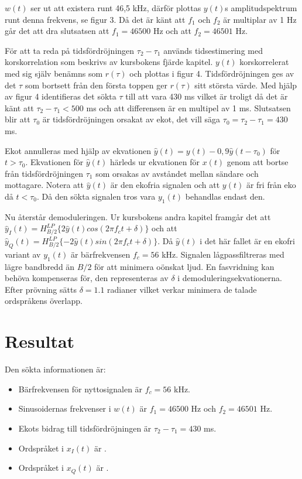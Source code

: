 \documentclass[10pt,twocolumn]{article}
\begin{document}
$w(t)$ ser ut att existera runt 46,5 kHz, därför plottas $y(t)$s amplitudspektrum runt denna frekvens, se figur 3. Då det är känt att $f_1$ och $f_2$ är multiplar av 1 Hz går det att dra slutsatsen att $f_1=46500$ Hz och att $f_2=46501$ Hz.

För att ta reda på tidsfördröjningen $\tau_2-\tau_1$ används tidsestimering med korskorrelation som beskrivs av kursbokens fjärde kapitel. $y(t)$ korskorrelerat med sig själv benämns som $r(\tau)$ och plottas i figur 4. Tidsfördröjningen ges av det $\tau$ som bortsett från den första toppen ger $r(\tau)$ sitt största värde. Med hjälp av figur 4 identifieras det sökta $\tau$ till att vara 430 ms vilket är troligt då det är känt att $\tau_2-\tau_1 < 500$ ms och att differensen är en multipel av 1 ms. Slutsatsen blir att $\tau_0$ är tidsfördröjningen orsakat av ekot, det vill säga $\tau_0=\tau_2-\tau_1=430$ ms.

Ekot annulleras med hjälp av ekvationen $\hat{y}(t)=y(t) - 0,9\hat{y}(t-\tau_0)$ för $t > \tau_0$. Ekvationen för $\hat{y}(t)$ härleds ur ekvationen för $x(t)$ genom att bortse från tidsfördröjningen $\tau_1$ som orsakas av avståndet mellan sändare och mottagare. Notera att $\hat{y}(t)$ är den ekofria signalen och att $y(t)$ är fri från eko då $t < \tau_0$. Då den sökta signalen tros vara $y_1(t)$ behandlas endast den. 

Nu återstår demoduleringen. Ur kursbokens andra kapitel framgår det att $\hat{y}_I(t)=H^{LP}_{B/2}\{2\hat{y}(t)cos(2\pi f_{c}t+\delta)\}$ och att $\hat{y}_Q(t)=H^{LP}_{B/2}\{-2\hat{y}(t)sin(2\pi f_{c}t+\delta)\}$. Då $\hat{y}(t)$ i det här fallet är en ekofri variant av $y_1(t)$ är bärfrekvensen $f_c=56$ kHz. Signalen lågpassfiltreras med lägre bandbredd än $B/2$ för att minimera oönskat ljud. En fasvridning kan behöva kompenseras för, den representeras av $\delta$ i demoduleringsekvationerna. Efter prövning sätts $\delta=1.1$ radianer vilket verkar minimera de talade ordspråkens överlapp.

\section{Resultat}

Den sökta informationen är:
\begin{itemize}
\item Bärfrekvensen för nyttosignalen är $f_c=56$ kHz.
\item Sinusoidernas frekvenser i $w(t)$ är $f_1=46500$ Hz och $f_2=46501$ Hz.
\item Ekots bidrag till tidsfördröjningen är $\tau_2-\tau_1=430$ ms.
\item Ordspråket i $x_I(t)$ är .
\item Ordspråket i $x_Q(t)$ är .
\end{itemize}
\end{document}
